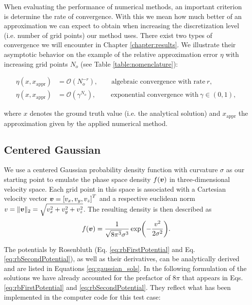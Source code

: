 When evaluating the performance of numerical methods, an important criterion is determine
the rate of convergence.
With this we mean how much better of an approximation we can expect to obtain when increasing the
discretization level (i.e. number of grid points) our method uses.
There exist two types of convergence we will encounter in Chapter \ref{chapter:results}.
We illustrate their asymptotic behavior on the example of the relative approximation error $\eta$ with increasing grid points $N_o$ (see Table \ref{table:nomenclature}):

\begin{align}
    \label{eq:convergenceDefinition}
    \eta(x, x_{\text{appr}}) &= \mathcal O(N_o^{-r}), \quad \quad \text{algebraic convergence with
    rate}\ r, \\
    \eta(x, x_{\text{appr}}) &= \mathcal O(\gamma^{N_o}), \quad \quad\ \text{exponential convergence
    with}\ \gamma
    \in (0,1),
\end{align}

where $x$ denotes the ground truth value (i.e. the analytical solution) and $x_{\text{appr}}$ the
approximation given by the applied numerical method.


\subsection{Centered Gaussian}
\label{sub:centered_gaussian}

We use a centered Gaussian probability density function with curvature $\sigma$ as our starting
point to emulate the phase space density $f(\boldsymbol{v})$ in three-dimensional velocity space.
Each grid point in this space is associated with a Cartesian velocity vector $\boldsymbol{v} = \left [ v_x, v_y, v_z \right]^T$ and a respective euclidean norm $v  = \lVert \boldsymbol{v} \rVert_2 = \sqrt{v_x^2+v_y^2+v_z^2}$.
The resulting density is then described as
\begin{equation}
\label{eq:gaussian_pdf}
f(\boldsymbol{v}) = \frac{1}{\sqrt{8\pi^3} \sigma^3} \exp(-\frac{v^2}{2 \sigma^2}).
\end{equation}

The potentials by Rosenbluth (Eq. \ref{eq:rbFirstPotential} and Eq. \ref{eq:rbSecondPotential}), as
well as their derivatives, can be analytically derived and are listed in Equations \ref{eq:gaussian_sols}.
In the following formulation of the solutions we have already accounted for the prefactor of $8\pi$
that appears in Eqs. \ref{eq:rbFirstPotential} and \ref{eq:rbSecondPotential}.
They reflect what has been implemented in the computer code for this test case:

